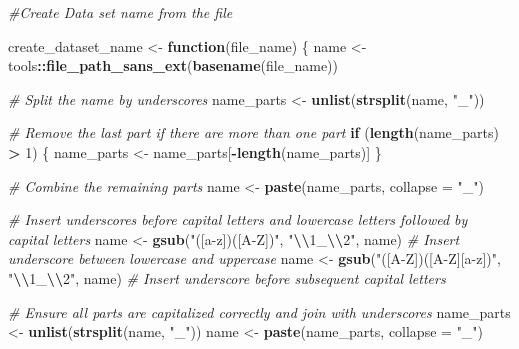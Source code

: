 \documentclass[
]{article}
\newenvironment{Shaded}{\begin{snugshade}}{\end{snugshade}}
\newcommand{\AttributeTok}[1]{\textcolor[rgb]{0.13,0.29,0.53}{#1}}
\newcommand{\CommentTok}[1]{\textcolor[rgb]{0.56,0.35,0.01}{\textit{#1}}}
\newcommand{\ControlFlowTok}[1]{\textcolor[rgb]{0.13,0.29,0.53}{\textbf{#1}}}
\newcommand{\DecValTok}[1]{\textcolor[rgb]{0.00,0.00,0.81}{#1}}
\newcommand{\FunctionTok}[1]{\textcolor[rgb]{0.13,0.29,0.53}{\textbf{#1}}}
\newcommand{\NormalTok}[1]{#1}
\newcommand{\OtherTok}[1]{\textcolor[rgb]{0.56,0.35,0.01}{#1}}
\newcommand{\SpecialCharTok}[1]{\textcolor[rgb]{0.81,0.36,0.00}{\textbf{#1}}}
\newcommand{\StringTok}[1]{\textcolor[rgb]{0.31,0.60,0.02}{#1}}
\begin{document}
\begin{Shaded}
\begin{Highlighting}[]
\CommentTok{\#Create Data set name from the file}

\NormalTok{create\_dataset\_name }\OtherTok{\textless{}{-}} \ControlFlowTok{function}\NormalTok{(file\_name)}
\NormalTok{\{}
\NormalTok{   name }\OtherTok{\textless{}{-}}\NormalTok{ tools}\SpecialCharTok{::}\FunctionTok{file\_path\_sans\_ext}\NormalTok{(}\FunctionTok{basename}\NormalTok{(file\_name))}

   \CommentTok{\# Split the name by underscores}
\NormalTok{  name\_parts }\OtherTok{\textless{}{-}} \FunctionTok{unlist}\NormalTok{(}\FunctionTok{strsplit}\NormalTok{(name, }\StringTok{"\_"}\NormalTok{))}
  
  \CommentTok{\# Remove the last part if there are more than one part}
  \ControlFlowTok{if}\NormalTok{ (}\FunctionTok{length}\NormalTok{(name\_parts) }\SpecialCharTok{\textgreater{}} \DecValTok{1}\NormalTok{) \{}
\NormalTok{    name\_parts }\OtherTok{\textless{}{-}}\NormalTok{ name\_parts[}\SpecialCharTok{{-}}\FunctionTok{length}\NormalTok{(name\_parts)]}
\NormalTok{  \}}
  
  \CommentTok{\# Combine the remaining parts}
\NormalTok{  name }\OtherTok{\textless{}{-}} \FunctionTok{paste}\NormalTok{(name\_parts, }\AttributeTok{collapse =} \StringTok{"\_"}\NormalTok{)}
   
   
 \CommentTok{\# Insert underscores before capital letters and lowercase letters followed by capital letters}
\NormalTok{  name }\OtherTok{\textless{}{-}} \FunctionTok{gsub}\NormalTok{(}\StringTok{"([a{-}z])([A{-}Z])"}\NormalTok{, }\StringTok{"}\SpecialCharTok{\textbackslash{}\textbackslash{}}\StringTok{1\_}\SpecialCharTok{\textbackslash{}\textbackslash{}}\StringTok{2"}\NormalTok{, name)    }\CommentTok{\# Insert underscore between lowercase and uppercase}
\NormalTok{  name }\OtherTok{\textless{}{-}} \FunctionTok{gsub}\NormalTok{(}\StringTok{"([A{-}Z])([A{-}Z][a{-}z])"}\NormalTok{, }\StringTok{"}\SpecialCharTok{\textbackslash{}\textbackslash{}}\StringTok{1\_}\SpecialCharTok{\textbackslash{}\textbackslash{}}\StringTok{2"}\NormalTok{, name) }\CommentTok{\# Insert underscore before subsequent capital letters}
  
  \CommentTok{\# Ensure all parts are capitalized correctly and join with underscores}
\NormalTok{  name\_parts }\OtherTok{\textless{}{-}} \FunctionTok{unlist}\NormalTok{(}\FunctionTok{strsplit}\NormalTok{(name, }\StringTok{"\_"}\NormalTok{))}
\NormalTok{  name }\OtherTok{\textless{}{-}} \FunctionTok{paste}\NormalTok{(name\_parts, }\AttributeTok{collapse =} \StringTok{"\_"}\NormalTok{)}
  

\end{Highlighting}
\end{Shaded}
\end{document}
